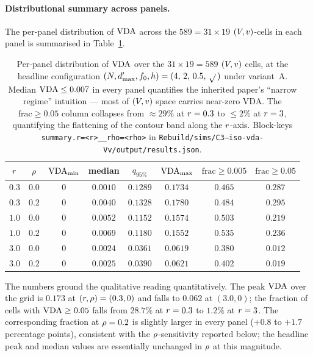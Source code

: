\paragraph{Distributional summary across panels.}
The per-panel distribution of $\mathrm{VDA}$ across the $589 = 31 \times 19$
$(V, v)$-cells in each panel is summarised in
Table~\ref{tab:c3-marginals}.
%
\begin{table}[t]
  \centering
  \small
  \begin{tabular}{c c c c c c c c}
    \toprule
    $r$ & $\rho$ &
    $\mathrm{VDA}_{\min}$ & median & $q_{95\%}$ & $\mathrm{VDA}_{\max}$ &
    $\mathrm{frac}\!\ge\!0.005$ & $\mathrm{frac}\!\ge\!0.05$ \\
    \midrule
    $0.3$ & $0.0$ & $0$ & $0.0010$ & $0.1289$ & $\mathbf{0.1734}$ & $0.465$ & $0.287$\\
    $0.3$ & $0.2$ & $0$ & $0.0040$ & $0.1328$ & $\mathbf{0.1780}$ & $0.484$ & $0.295$\\
    \midrule
    $1.0$ & $0.0$ & $0$ & $0.0052$ & $0.1152$ & $0.1574$ & $0.503$ & $0.219$\\
    $1.0$ & $0.2$ & $0$ & $0.0069$ & $0.1180$ & $0.1552$ & $0.535$ & $0.236$\\
    \midrule
    $3.0$ & $0.0$ & $0$ & $0.0024$ & $0.0361$ & $0.0619$ & $0.380$ & $0.012$\\
    $3.0$ & $0.2$ & $0$ & $0.0025$ & $0.0390$ & $0.0621$ & $0.402$ & $0.019$\\
    \bottomrule
  \end{tabular}
  \caption{Per-panel distribution of $\mathrm{VDA}$ over the $31 \times 19 =
  589$ $(V, v)$ cells, at the headline configuration
  $(N, d'_{\max}, f_0, h) = (4,\,2,\,0.5,\,\sqrt{}\,)$ under
  variant~A. Median $\mathrm{VDA} \le 0.007$ in every panel quantifies the
  inherited paper's ``narrow regime'' intuition --- most of $(V,
  v)$ space carries near-zero VDA. The $\mathrm{frac}\!\ge\!0.05$
  column collapses from $\approx 29\%$ at $r = 0.3$ to $\le 2\%$
  at $r = 3$, quantifying the flattening of the contour band
  along the $r$-axis. Block-keys \texttt{summary.r=<r>\_\_rho=<rho>}
  in \texttt{Rebuild/sims/C3--iso-vda-Vv/output/results.json}.}
  \label{tab:c3-marginals}
\end{table}
%
The numbers ground the qualitative reading quantitatively. The peak
$\mathrm{VDA}$ over the grid is $0.173$ at $(r, \rho) = (0.3, 0)$ and
falls to $0.062$ at $(3.0, 0)$; the fraction of cells with $\mathrm{VDA}
\ge 0.05$ falls from $28.7\%$ at $r = 0.3$ to $1.2\%$ at
$r = 3$. The corresponding fraction at $\rho = 0.2$ is
slightly larger in every panel ($+0.8$ to $+1.7$ percentage points),
consistent with the $\rho$-sensitivity reported below; the headline
peak and median values are essentially unchanged in $\rho$ at this
magnitude.

